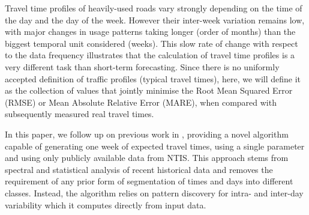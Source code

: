 \documentclass[a4paper, 10pt, conference]{ieeeconf}      %
\begin{document}
Travel time profiles of heavily-used roads vary strongly depending on the time of the day and the day of the week.
However their inter-week variation remains low, with major changes in usage patterns taking longer (order of months) than the biggest temporal unit considered (weeks). 
This slow rate of change with respect to the data frequency illustrates that the calculation of  travel time profiles is a very different task than short-term forecasting.
Since there is no uniformly accepted definition of traffic profiles (typical travel times), here, we will define it as the collection of values that jointly minimise the Root Mean Squared Error (RMSE) or Mean Absolute Relative Error (MARE), when compared with subsequently measured real travel times.

In this paper, we follow up on previous work in \cite{ttprofiles}, providing a novel algorithm capable of generating one week of expected travel times, using a single parameter and using only publicly available data from NTIS.
This approach stems from spectral and statistical analysis of recent historical data and removes the requirement of any prior form of segmentation of times and days into different classes. 
Instead, the algorithm relies on pattern discovery for intra- and inter-day variability which it computes directly from input data.
\end{document}
